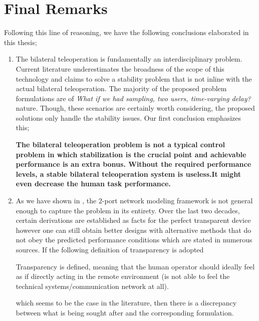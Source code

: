 \section{Final Remarks}
Following this line of reasoning, we have the following conclusions elaborated in this thesis;
\begin{enumerate}
    \item The bilateral teleoperation is fundamentally an interdisciplinary problem. Current literature underestimates the broadness of 
the scope of this technology and claims to solve a stability problem that is not inline with the actual bilateral teleoperation. The 
majority of the proposed problem formulations are of \emph{What if we had sampling, two users, time-varying delay?} nature. Though, these 
scenarios are certainly worth considering, the proposed solutions only handle the stability issues. Our first conclusion emphasizes this;
    
    {\bfseries The bilateral teleoperation problem is not a typical control problem in which stabilization is the crucial point and 
    achievable performance is an extra bonus. Without the required performance levels, a stable bilateral teleoperation system is useless.It 
    might even decrease the human task performance.}
    
    \item As we have shown in , the 2-port network modeling framework is not general enough to capture the problem in
    its entirety. Over the last two decades, certain derivations are established as facts for the perfect transparent device however one 
    can still obtain better designs with alternative methods that do not obey the predicted performance conditions which are stated in 
    numerous sources. If the following definition of transparency is adopted
    \begin{displayquote}
    Transparency is defined, meaning that the human operator should ideally feel as if directly acting in the remote environment
    (is not able to feel the technical systems/communication network at all).
    \end{displayquote}
    which seems to be the case in the literature, then there is a discrepancy between what is being sought after and the corresponding 
    formulation. 
    

\end{enumerate}
